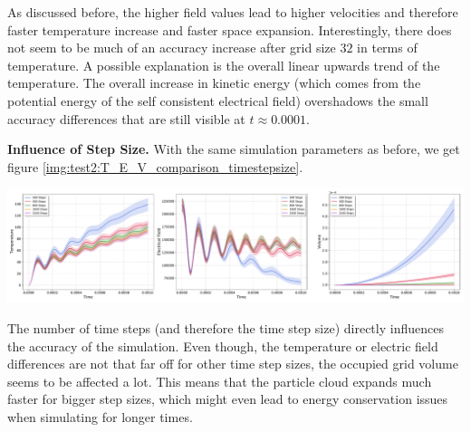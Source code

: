 As discussed before, the higher field values lead to higher velocities and therefore faster temperature increase and faster space expansion. Interestingly, there does not seem to be much of an accuracy increase after grid size $32$ in terms of temperature. A possible explanation is the overall linear upwards trend of the temperature. The overall increase in kinetic energy (which comes from the potential energy of the self consistent electrical field) overshadows the small accuracy differences that are still visible at $t \approx 0.0001$.


\textbf{Influence of Step Size.} With the same simulation parameters as before, we get figure \ref{img:test2:T_E_V_comparison_timestepsize}. \\
\begin{minipage}[h]{\linewidth}
    \vspace{5pt}
    \centering
    \includegraphics[width=\linewidth]{ressources/test2/T_E_V_comparison_timestepsize.pdf}
    \label{img:test2:T_E_V_comparison_timestepsize}
    \vspace{5pt}
\end{minipage}
The number of time steps (and therefore the time step size)  directly influences the accuracy of the simulation. Even though, the temperature or electric field differences are not that far off for other time step sizes, the occupied grid volume seems to be affected a lot. This means that the particle cloud expands much faster for bigger step sizes, which might even lead to energy conservation issues when simulating for longer times. 

